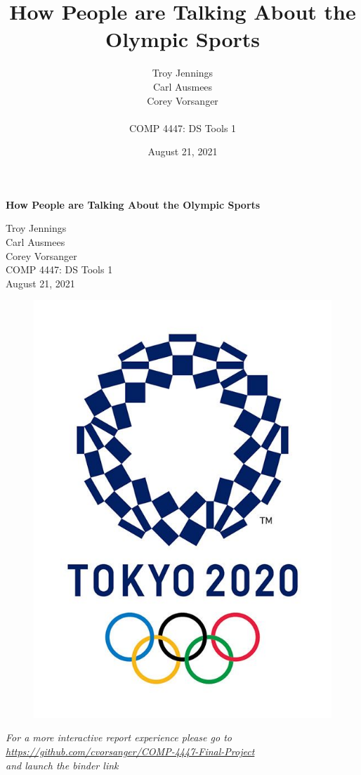 \documentclass[12pt]{article}
\title{How People are Talking About the Olympic Sports}
\author{Troy Jennings\\Carl Ausmees\\Corey Vorsanger\\  \\COMP 4447: DS Tools 1}
\date{August 21, 2021}
\begin{document}
    \begin{titlepage}
        {\center\huge\bfseries How People are Talking About the Olympic Sports \par}
        \vspace{1.5cm}
        \begin{center}
            Troy Jennings\\
            Carl Ausmees\\
            Corey Vorsanger\\
            \medskip
            COMP 4447: DS Tools 1\\
            \bigskip
            August 21, 2021
        \end{center}
        \begin{figure}[H]
            \centering
            \includegraphics[scale=0.5]{tokyo.jpg}
        \end{figure}
        \begin{center}
            \textit{For a more interactive report experience please go to\\
            \href{https://github.com/cvorsanger/COMP-4447-Final-Project}{https://github.com/cvorsanger/COMP-4447-Final-Project}\\
            and launch the binder link}
        \end{center}
    \end{titlepage}
\end{document}

